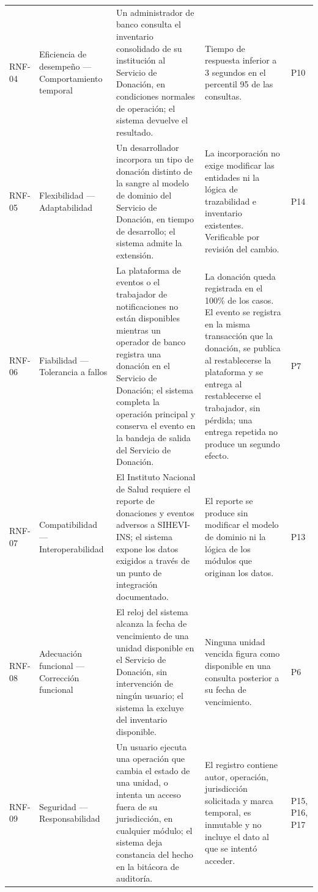 \documentclass[11pt,a4paper]{article}
\begin{document}
\begin{longtable}{L{1.2cm} L{2.5cm} L{6.4cm} L{2.6cm} L{1.4cm}}
RNF-04 & Eficiencia de desempeño — Comportamiento temporal & Un administrador de banco consulta el inventario consolidado de su institución al Servicio de Donación, en condiciones normales de operación; el sistema devuelve el resultado. & Tiempo de respuesta inferior a 3 segundos en el percentil 95 de las consultas. & P10 \\

RNF-05 & Flexibilidad — Adaptabilidad & Un desarrollador incorpora un tipo de donación distinto de la sangre al modelo de dominio del Servicio de Donación, en tiempo de desarrollo; el sistema admite la extensión. & La incorporación no exige modificar las entidades ni la lógica de trazabilidad e inventario existentes. Verificable por revisión del cambio. & P14 \\

RNF-06 & Fiabilidad — Tolerancia a fallos & La plataforma de eventos o el trabajador de notificaciones no están disponibles mientras un operador de banco registra una donación en el Servicio de Donación; el sistema completa la operación principal y conserva el evento en la bandeja de salida del Servicio de Donación. & La donación queda registrada en el 100\% de los casos. El evento se registra en la misma transacción que la donación, se publica al restablecerse la plataforma y se entrega al restablecerse el trabajador, sin pérdida; una entrega repetida no produce un segundo efecto. & P7 \\

RNF-07 & Compatibilidad — Interoperabilidad & El Instituto Nacional de Salud requiere el reporte de donaciones y eventos adversos a SIHEVI-INS; el sistema expone los datos exigidos a través de un punto de integración documentado. & El reporte se produce sin modificar el modelo de dominio ni la lógica de los módulos que originan los datos. & P13 \\

RNF-08 & Adecuación funcional — Corrección funcional & El reloj del sistema alcanza la fecha de vencimiento de una unidad disponible en el Servicio de Donación, sin intervención de ningún usuario; el sistema la excluye del inventario disponible. & Ninguna unidad vencida figura como disponible en una consulta posterior a su fecha de vencimiento. & P6 \\

RNF-09 & Seguridad — Responsabilidad & Un usuario ejecuta una operación que cambia el estado de una unidad, o intenta un acceso fuera de su jurisdicción, en cualquier módulo; el sistema deja constancia del hecho en la bitácora de auditoría. & El registro contiene autor, operación, jurisdicción solicitada y marca temporal, es inmutable y no incluye el dato al que se intentó acceder. & P15, P16, P17 \\


\end{longtable}
\end{document}
